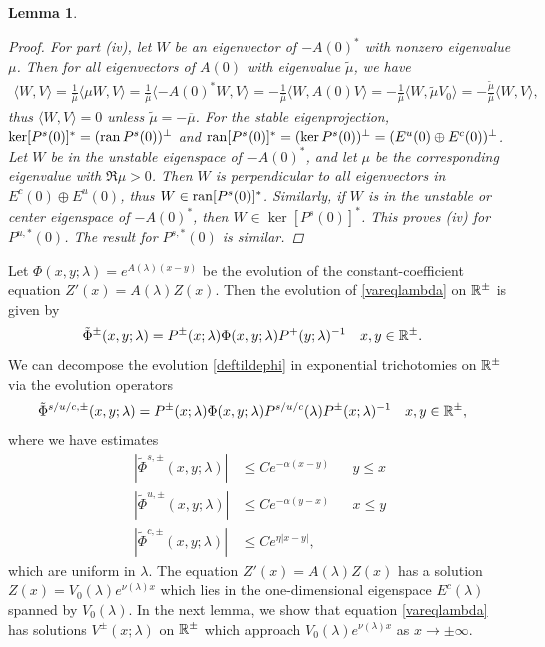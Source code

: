 \documentclass[10pt,reqno]{amsart}
\theoremstyle{plain}
\newtheorem{lemma}[theorem]{Lemma}
\theoremstyle{definition}
\theoremstyle{remark}
\numberwithin{theorem}{section}
\numberwithin{equation}{section}
\begin{document}
\begin{lemma}
\begin{proof}
For part (iv), let $W$ be an eigenvector of $-A(0)^*$ with nonzero eigenvalue $\mu$. Then for all eigenvectors of $A(0)$ with eigenvalue $\tilde{\mu}$, we have 
\begin{align*}
\langle W, V \rangle = \frac{1}{\overline{\mu}} \langle \mu W, V \rangle
= \frac{1}{\overline{\mu}}\langle -A(0)^* W, V \rangle = -\frac{1}{\overline{\mu}}\langle W, A(0) V \rangle = -\frac{1}{\overline{\mu}}\langle W, \tilde{\mu} V_0 \rangle = -\frac{\tilde{\mu}}{\overline{\mu}}\langle W, V \rangle,
\end{align*}
thus $\langle W, V \rangle = 0$ unless $\tilde{\mu} = -\overline{\mu}$. For the stable eigenprojection, $\mathop\mathrm{ker}\nolimits [P^s(0)]^* = (\operatorname{ran} P^s(0))^\perp$ and $\operatorname{ran} [P^s(0)]^* = (\mathop\mathrm{ker}\nolimits P^s(0))^\perp = (E^u(0) \oplus E^c(0))^\perp$. Let $W$ be in the unstable eigenspace of $-A(0)^*$, and let $\mu$ be the corresponding eigenvalue with $\Re \mu > 0$. Then $W$ is perpendicular to all eigenvectors in $E^c(0) \oplus E^u(0)$, thus $W \in \operatorname{ran} [P^s(0)]^*$. Similarly, if $W$ is in the unstable or center eigenspace of $-A(0)^*$, then $W \in \ker [P^s(0)]^*$. This proves (iv) for $P^{u,*}(0)$. The result for $P^{s,*}(0)$ is similar.
\end{proof}
\end{lemma}

Let $\Phi(x, y; \lambda) = e^{A(\lambda)(x-y)}$ be the evolution of the constant-coefficient equation $Z'(x) = A(\lambda) Z(x)$. Then the evolution of \cref{vareqlambda} on $\mathbb{R}^\pm$ is given by
\begin{align}\label{deftildephi}
\tilde{\Phi}^\pm(x, y; \lambda) &= P^\pm(x; \lambda) \Phi(x, y; \lambda) P^+(y; \lambda)^{-1} && x, y \in \mathbb{R}^\pm.
\end{align}
We can decompose the evolution \cref{deftildephi} in exponential trichotomies on $\mathbb{R}^\pm$ via the evolution operators
\begin{align}\label{tildephitrich}
\tilde{\Phi}^{s/u/c, \pm}(x, y; \lambda) &= P^\pm(x; \lambda) \Phi(x, y; \lambda) P^{s/u/c}(\lambda) P^\pm(x; \lambda)^{-1} && x, y \in \mathbb{R}^\pm,
\end{align}
where we have estimates
\begin{equation}\label{stdtrichbounds}
\begin{aligned}
|\tilde{\Phi}^{s,\pm}(x, y; \lambda)| &\leq C e^{-\alpha(x - y)} && y \leq x \\
|\tilde{\Phi}^{u,\pm}(x, y; \lambda)| &\leq C e^{-\alpha(y - x)} && x \leq y \\
|\tilde{\Phi}^{c,\pm}(x, y; \lambda)| &\leq C e^{\eta|x - y|},
\end{aligned}
\end{equation}
which are uniform in $\lambda$. The equation $Z'(x) = A(\lambda) Z(x)$ has a solution $Z(x) = V_0(\lambda)e^{\nu(\lambda)x}$ which lies in the one-dimensional eigenspace $E^c(\lambda)$ spanned by $V_0(\lambda)$. In the next lemma, we show that equation \cref{vareqlambda} has solutions $V^\pm(x; \lambda)$ on $\mathbb{R}^\pm$ which approach $V_0(\lambda)e^{\nu(\lambda)x}$ as $x \rightarrow \pm \infty$. 
\end{document}
